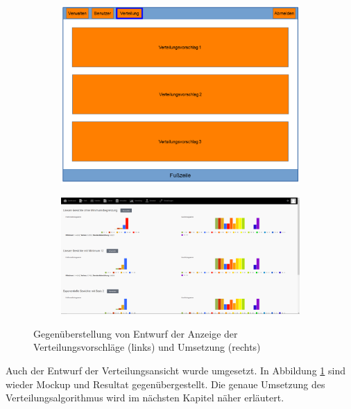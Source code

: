         \begin{figure}
            \centering
            \begin{subfigure}{0.4\textwidth}
                \includegraphics[width=1.0\textwidth]{./implementation/images/MockUpsBackend/backendDistribution.png}
            \end{subfigure}
            \begin{subfigure}{0.59\textwidth}
                \includegraphics[width=1.0\textwidth]{./implementation/images/distribution.png}
            \end{subfigure}
            \caption{Gegenüberstellung von Entwurf der Anzeige der Verteilungsvorschläge (links) und Umsetzung (rechts)}
            \label{fig:comparisonDistribution}
        \end{figure}
    
        Auch der Entwurf der Verteilungsansicht wurde umgesetzt.
        In Abbildung \ref{fig:comparisonDistribution} sind wieder Mockup und Resultat gegenübergestellt.
        Die genaue Umsetzung des Verteilungsalgorithmus wird im nächsten Kapitel näher erläutert.
        
